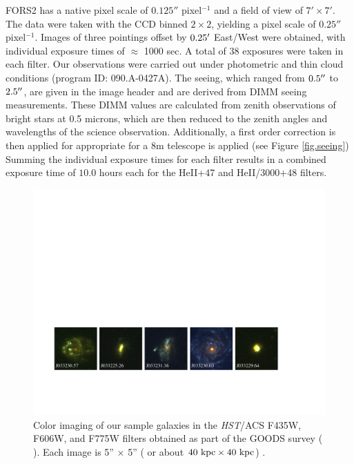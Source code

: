 \documentclass[twocolumn]{aastex61}
\begin{document}
FORS2 has a native pixel scale of $0.125''$ pixel$^{-1}$ and a field of view of $7'\times7'$.  The data were taken with 
the CCD binned $2\times2$, yielding a pixel scale of $0.25''$ pixel$^{-1}$.
Images of three pointings offset by $0.25\mbox{$^\prime$}$ East/West were obtained, with individual exposure times of $\approx$ 1000 sec.  A total of 38  exposures were taken in each filter. 
Our observations were carried out under photometric and thin cloud conditions (program ID: 090.A-0427A). The seeing, which ranged from $0.5\mbox{$^{\prime\prime}$}$ to $2.5\mbox{$^{\prime\prime}$}$, are given in the image header and are derived from DIMM seeing measurements. These DIMM values are calculated from zenith observations of bright stars at 0.5 microns, which are then reduced to the zenith angles and wavelengths of the science observation. Additionally, a first order correction is then applied for appropriate for a 8m telescope is applied (see Figure \ref{fig.seeing})  Summing the individual exposure times for each filter results in a combined exposure time of $10.0$ hours each for the HeII+47 and HeII/3000+48 filters.

\begin{figure}[!ht]
\centering
\includegraphics[scale=.73]{../Figures/fors2_color_imstamps.pdf}
\caption{Color imaging of our sample galaxies in the \emph{HST}/ACS F435W, F606W, and F775W filters obtained as part of the GOODS survey (\citeauthor{Giavalisco2004} \citeyear{Giavalisco2004}). Each image is 5'' $\times$ 5'' ( or about $ 40 \rm \ kpc \times 40 \rm \ kpc $) .\label{fig:hstims}}
\end{figure}
\end{document}
